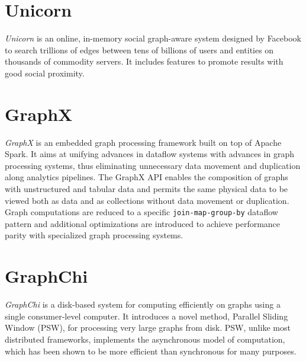 \documentclass[letterpaper,twocolumn,10pt]{article}
\begin{document}
\section{Unicorn}
\textit{Unicorn} is an online, in-memory social graph-aware system designed by Facebook to search trillions of edges between tens of billions of users and entities on thousands of commodity servers. It includes features to promote results with good social proximity.

\section{GraphX}
\textit{GraphX} is an embedded graph processing framework built on top of Apache Spark. It aims at unifying advances in dataflow systems with advances in graph processing systems, thus eliminating unnecessary data movement and duplication along analytics pipelines. The GraphX API enables the composition of graphs with unstructured and tabular data and permits the same physical data to be viewed both as data and as collections without data movement or duplication.
Graph computations are reduced to a specific {\tt join-map-group-by} dataflow pattern and additional optimizations are introduced to achieve performance parity with specialized graph processing systems.

\section{GraphChi}
\textit{GraphChi} is a disk-based system for computing efficiently on graphs using a single consumer-level computer. It introduces a novel method, Parallel Sliding Window (PSW), for processing very large graphs from disk. PSW, unlike most distributed frameworks, implements the asynchronous model of computation, which has been shown to be more efficient than synchronous for many purposes.	
\end{document}
